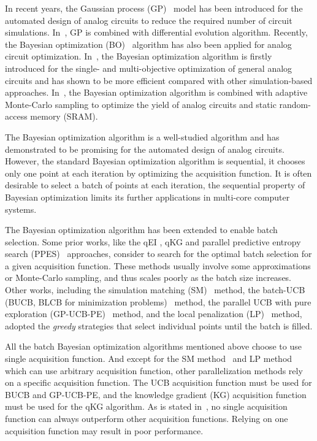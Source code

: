 
In recent years, the Gaussian process (GP)~\cite{GPML} model has been
introduced for the automated design of analog circuits to reduce the
required number of circuit simulations. In~\cite{liu2014gaspad}, GP is combined
with differential evolution algorithm. Recently, the Bayesian optimization
(BO)~\cite{shahriari2016taking} algorithm has also been applied for analog
circuit optimization. In~\cite{lyu2017efficient}, the Bayesian optimization
algorithm is firstly introduced for the single- and multi-objective
optimization of general analog circuits and has shown to be more efficient
compared with other simulation-based approaches. In~\cite{wang2017efficient},
the Bayesian optimization algorithm is combined with adaptive Monte-Carlo
sampling to optimize the yield of analog circuits and static random-access
memory (SRAM).

The Bayesian optimization algorithm is a well-studied algorithm and has
demonstrated to be promising for the automated design of analog circuits.
However, the standard Bayesian optimization algorithm is sequential, it chooses
only one point at each iteration by optimizing the acquisition function. It is
often desirable to select a batch of points at each iteration, the sequential
property of Bayesian optimization limits its further applications in multi-core computer systems.

The Bayesian optimization algorithm has been extended to enable batch
selection. Some prior works, like the qEI \cite{qEI}, qKG \cite{wu2016parallel}
and parallel predictive entropy search (PPES)~\cite{shah2015parallel}
approaches, consider to search for the optimal batch selection for a given
acquisition function. These methods usually involve some approximations or
Monte-Carlo sampling, and thus scales poorly as the batch size increases. Other
works, including the simulation matching (SM)~\cite{azimi2010batch} method, the
batch-UCB (BUCB, BLCB for minimization
problems)~\cite{desautels2014parallelizing} method, the parallel UCB with pure
exploration (GP-UCB-PE)~\cite{contal2013parallel} method, and the local
penalization (LP)~\cite{gonzalez2016batch} method, adopted the \emph{greedy}
strategies that select individual points until the batch is filled.

All the batch Bayesian optimization algorithms mentioned above choose to use single acquisition function.
And except for the SM method~\cite{azimi2010batch} and LP method~\cite{gonzalez2016batch} which can use arbitrary acquisition
function, other parallelization methods rely on a specific acquisition
function. The UCB acquisition function must be used for BUCB and GP-UCB-PE, and
the knowledge gradient (KG) acquisition function must be used for the qKG algorithm. As is stated
in~\cite{hoffman2011portfolio}, no single acquisition function can always
outperform other acquisition functions. Relying on one acquisition function may
result in poor performance.

